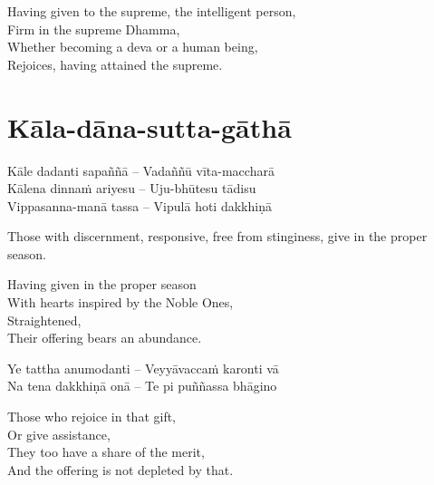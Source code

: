 \begin{english-verses}
  Having given to the supreme, the intelligent person,\\
  Firm in the supreme Dhamma,\\
  Whether becoming a deva or a human being,\\
  Rejoices, having attained the supreme.
\end{english-verses}

\suttaRef{[AN 5.32]}

\section{Kāla-dāna-sutta-gāthā}
\label{kala-dana-sutta-gatha}

\begin{twochants}
  Kāle dadanti sapaññā – Vadaññū vīta-maccharā\\
  Kālena dinnaṁ ariyesu – Uju-bhūtesu tādisu\\
  Vippasanna-manā tassa – Vipulā hoti dakkhiṇā
\end{twochants}

\vspace{16pt}

\begin{english-verses}
\begin{english-hangtogether}
  Those with discernment, responsive, free from stinginess, give in the proper season.
\end{english-hangtogether}
  Having given in the proper season\\
  With hearts inspired by the Noble Ones,\\
  Straightened,\\
  Their offering bears an abundance.
\end{english-verses}

\begin{twochants}
  Ye tattha anumodanti – Veyyāvaccaṁ karonti vā\\
  Na tena dakkhiṇā onā – Te pi puññassa bhāgino
\end{twochants}

\begin{english-verses}
  Those who rejoice in that gift,\\
  Or give assistance,\\
  They too have a share of the merit,\\
  And the offering is not depleted by that.
\end{english-verses}

